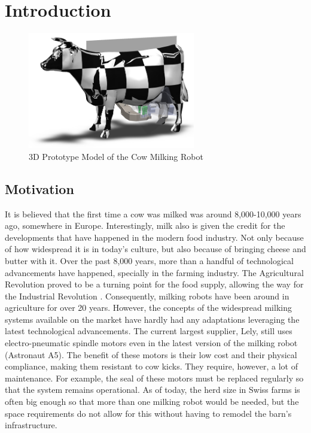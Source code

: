 \chapter{Introduction}\label{chap:introduction}
   \begin{figure}[!ht]
        \centering
        \includegraphics[width=0.65\textwidth]{images/cow_system.png}
        \caption{3D Prototype Model of the Cow Milking Robot}
        \label{fig:cow_fmc}
    \end{figure}
    
\section{Motivation}\label{chap:1:motivation}
It is believed that the first time a cow was milked was around 8,000-10,000 years ago, somewhere in Europe\cite{valente_2017}. Interestingly, milk also is given the credit for the developments that have happened in the modern food industry. Not only because of how widespread it is in today's culture, but also because of bringing cheese and butter with it. Over the past 8,000 years, more than a handful of technological advancements have happened, specially in the farming industry. The Agricultural Revolution proved to be a turning point for the food supply, allowing the way for the Industrial Revolution \cite{lumenlearning_2021}. Consequently, milking robots have been around in agriculture for over 20 years. However, the concepts of the widespread milking systems available on the market have hardly had any adaptations leveraging the latest technological advancements. The current largest supplier, Lely, still uses electro-pneumatic spindle motors even in the latest version of the milking robot (Astronaut A5). The benefit of these motors is their low cost and their physical compliance, making them resistant to cow kicks. They require, however, a lot of maintenance. For example, the seal of these motors must be replaced regularly so that the system remains operational. As of today, the herd size in Swiss farms is often big enough so that more than one milking robot would be needed, but the space requirements do not allow for this without having to remodel the barn's infrastructure.

